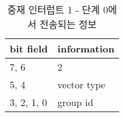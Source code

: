 %
%
\begin{table}[htbp]
\caption{중재 인터럽트 1 - 단계 0에서 전송되는 정보}\label{table:arb-int-p0}
   \begin{center}
   \begin{tabular}{|l|l|} \hline
	bit field & information \\
\hline \hline
	7, 6 & 2 \\ \hline
	5, 4 & vector type \\ \hline
	3, 2, 1, 0 & group id \\
\hline
   \end{tabular}
   \end{center}
\end{table}
%
%
